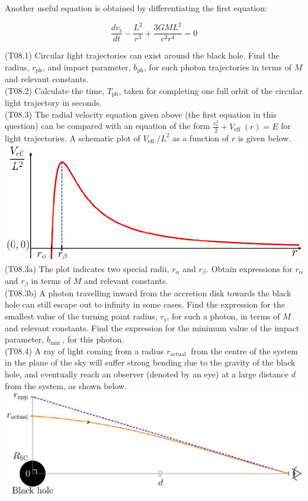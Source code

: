 \documentclass[10pt]{article}
\begin{document}
    Another useful equation is obtained by differentiating the first equation:
    
    $$
    \frac{d v_{\mathrm{r}}}{d t}-\frac{L^{2}}{r^{3}}+\frac{3 G M L^{2}}{c^{2} r^{4}}=0
    $$
    
    (T08.1) Circular light trajectories can exist around the black hole. Find the radius, $r_{\mathrm{ph}}$, and impact parameter, $b_{\mathrm{ph}}$, for such photon trajectories in terms of $M$ and relevant constants.\\
    (T08.2) Calculate the time, $T_{\mathrm{ph}}$, taken for completing one full orbit of the circular light trajectory in seconds.\\
    (T08.3) The radial velocity equation given above (the first equation in this question) can be compared with an equation of the form $\frac{v_{\mathrm{r}}^{2}}{2}+V_{\text {eff }}(r)=E$ for light trajectories. A schematic plot of $V_{\text {eff }} / L^{2}$ as a function of $r$ is given below.\\
    \includegraphics[max width=\textwidth, center]{2025_08_23_e94579452776a99c4850g-08}\\
    (T08.3a) The plot indicates two special radii, $r_{\alpha}$ and $r_{\beta}$. Obtain expressions for $r_{\alpha}$ and $r_{\beta}$ in terms of $M$ and relevant constants.\\
    (T08.3b) A photon travelling inward from the accretion disk towards the black hole can still escape out to infinity in some cases. Find the expression for the smallest value of the turning point radius, $r_{\mathrm{t}}$, for such a photon, in terms of $M$ and relevant constants. Find the expression for the minimum value of the impact parameter, $b_{\text {min }}$, for this photon.\\
    (T08.4) A ray of light coming from a radius $r_{\text {actual }}$ from the centre of the system in the plane of the sky will suffer strong bending due to the gravity of the black hole, and eventually reach an observer (denoted by an eye) at a large distance $d$ from the system, as shown below.\\
    \includegraphics[max width=\textwidth, center]{2025_08_23_e94579452776a99c4850g-08(1)}
    
\end{document}
